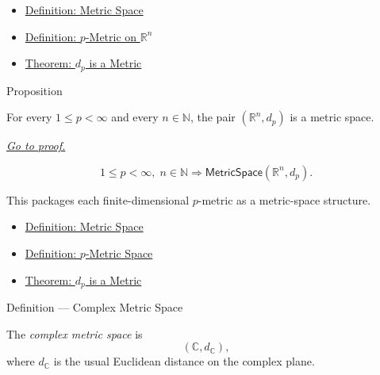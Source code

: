\begin{dependencies}
\begin{itemize}
  \item \hyperref[def:metric-space]{Definition: Metric Space}
  \item \hyperref[def:lp-metric-rn]{Definition: \(p\)-Metric on \(\mathbb{R}^n\)}
  \item \hyperref[thm:lp-metric-rn]{Theorem: \(d_p\) is a Metric}
\end{itemize}
\end{dependencies}

\begin{propositionbox}{Proposition}
\begin{proposition}
\label{prop:lp-metric-space-instance}
For every \(1\leq p<\infty\) and every \(n\in\mathbb{N}\), the pair \((\mathbb{R}^n,d_p)\) is a metric space.

\smallskip
\noindent
\hyperref[prf:lp-metric-space-instance]{\textit{Go to proof.}}
\end{proposition}
\end{propositionbox}

\begin{remark*}
\[
  1\leq p<\infty,\; n\in\mathbb{N}\Longrightarrow\mathsf{MetricSpace}(\mathbb{R}^n,d_p).
\]
\end{remark*}

\begin{remark*}[Interpretation]
This packages each finite-dimensional \(p\)-metric as a metric-space structure.
\end{remark*}

\begin{dependencies}
\begin{itemize}
  \item \hyperref[def:metric-space]{Definition: Metric Space}
  \item \hyperref[def:lp-metric-space]{Definition: \(p\)-Metric Space}
  \item \hyperref[thm:lp-metric-rn]{Theorem: \(d_p\) is a Metric}
\end{itemize}
\end{dependencies}

\begin{definitionbox}{Definition --- Complex Metric Space}
\begin{definition}\label{def:complex-metric-space}
The \emph{complex metric space} is
\[
  (\mathbb{C},d_{\mathbb{C}}),
\]
where \(d_{\mathbb{C}}\) is the usual Euclidean distance on the complex plane.
\end{definition}
\end{definitionbox}

